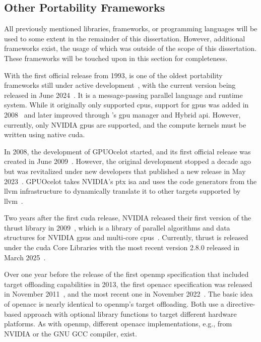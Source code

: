 \subsection{Other Portability Frameworks}
\label{sec:frameworks:other}

All previously mentioned libraries, frameworks, or programming languages will be used to some extent in the remainder of this dissertation. 
However, additional frameworks exist, the usage of which was outside of the scope of this dissertation. 
These frameworks will be touched upon in this section for completeness. 

With the first official release from 1993, \charmpp is one of the oldest portability frameworks still under active development~\cite{kale_charm_1993, kale_uiuc-pplcharm_2021}, with the current version being released in June 2024~\cite{noauthor_release_2024}. 
It is a message-passing parallel language and runtime system. 
While it originally only supported \glspl{cpu}, support for \glspl{gpu} was added in 2008~\cite{wesolowski_application_2008} and later improved through \charmpp's \gls{gpu} manager and Hybrid \gls{api}. 
However, currently, only NVIDIA \glspl{gpu} are supported, and the compute kernels must be written using native \gls{cuda}. 

In 2008, the development of GPUOcelot started, and its first official release was created in June 2009~\cite{diamos_release_2009}. 
However, the original development stopped a decade ago but was revitalized under new developers that published a new release in May 2023~\cite{noauthor_release_2023}. 
GPUOcelot takes NVIDIA's \gls{ptx} \gls{isa} and uses the code generators from the \gls{llvm} infrastructure to dynamically translate it to other targets supported by \gls{llvm}~\cite{diamos_ocelot_2010}. 

Two years after the first \gls{cuda} release, NVIDIA released their first version of the thrust library in 2009~\cite{nvidia_corporation_thrust_2009}, which is a library of parallel algorithms and data structures for NVIDIA \glspl{gpu} and multi-core \glspl{cpu}~\cite{bell_thrust_2012}. 
Currently, thrust is released under the \gls{cuda} \cpp Core Libraries with the most recent version 2.8.0 released in March 2025~\cite{cccl_development_team_release_2025}. 

Over one year before the release of the first \gls{openmp} specification that included target offloading capabilities in 2013, the first \gls{openacc} specification was released in November 2011~\cite{openacc_standard_openacc_2011, hutchison_openacc_2012}, and the most recent one in November 2022~\cite{openacc_standard_openacc_2022}. 
The basic idea of \gls{openacc} is nearly identical to \gls{openmp}'s target offloading. 
Both use a directive-based approach with optional library functions to target different hardware platforms. 
As with \gls{openmp}, different \gls{openacc} implementations, e.g., from NVIDIA or the GNU GCC compiler, exist. 

